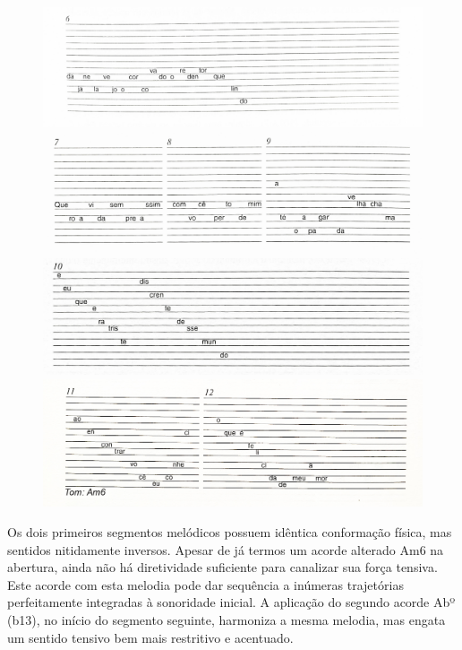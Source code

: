 \begin{figure}[H]
\includegraphics[width=\textwidth]{./imgs/figura3.jpg}

\includegraphics[width=\textwidth]{./imgs/figura4.jpg}

\includegraphics[width=\textwidth]{./imgs/figura5.jpg}

\includegraphics[width=\textwidth]{./imgs/figura6.jpg}
\end{figure}

Os dois primeiros segmentos melódicos possuem idêntica conformação
física, mas sentidos nitidamente inversos. Apesar de já termos um acorde
alterado Am6 na abertura, ainda não há diretividade suficiente para
canalizar sua força tensiva. Este acorde com esta melodia pode dar
sequência a inúmeras trajetórias perfeitamente integradas à sonoridade
inicial. A aplicação do segundo acorde Abº\,(b13), no início do
segmento seguinte, harmoniza a mesma melodia, mas engata um sentido
tensivo bem mais restritivo e acentuado.

